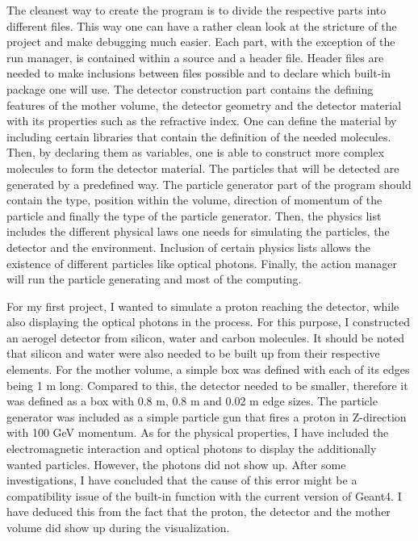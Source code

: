 \documentclass[a4paper,12pt]{extarticle}
\begin{document}
The cleanest way to create the program is to divide the respective parts into different files. This way one can have a rather clean look at the stricture of the project and make debugging much easier. Each part, with the exception of the run manager, is contained within a source and a header file. Header files are needed to make inclusions between files possible and to declare which built-in package one will use. The detector construction part contains the defining features of the mother volume, the detector geometry and the detector material with its properties such as the refractive index. One can define the material by including certain libraries that contain the definition of the needed molecules. Then, by declaring them as variables, one is able to construct more complex molecules to form the detector material. The particles that will be detected are generated by a predefined way. The particle generator part of the program should contain the type, position within the volume, direction of momentum of the particle and finally the type of the particle generator. Then, the physics list includes the different physical laws one needs for simulating the particles, the detector and the environment. Inclusion of certain physics lists allows the existence of different particles like optical photons. Finally, the action manager will run the particle generating and most of the computing.

For my first project, I wanted to simulate a proton reaching the detector, while also displaying the optical photons in the process. For this purpose, I constructed an aerogel detector from silicon, water and carbon molecules. It should be noted that silicon and water were also needed to be built up from their respective elements. For the mother volume, a simple box was defined with each of its edges being 1 m long. Compared to this, the detector needed to be smaller, therefore it was defined as a box with 0.8 m, 0.8 m and 0.02 m edge sizes. The particle generator was included as a simple particle gun that fires a proton in Z-direction with 100 GeV momentum. As for the physical properties, I have included the electromagnetic interaction and optical photons to display the additionally wanted particles. However, the photons did not show up. After some investigations, I have concluded that the cause of this error might be a compatibility issue of the built-in function with the current version of Geant4. I have deduced this from the fact that the proton, the detector and the mother volume did show up during the visualization.
\end{document}
